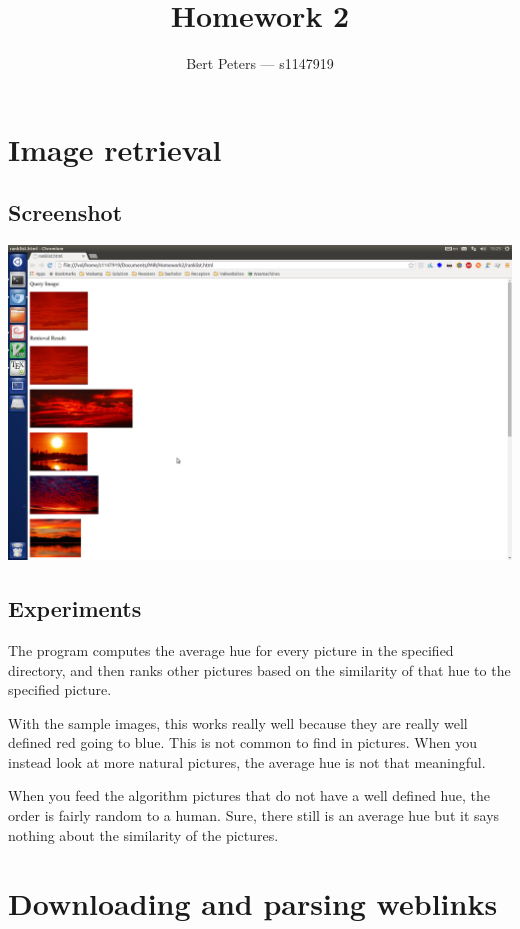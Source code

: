 \documentclass[12pt,a4paper]{article}
\title{Homework 2}
\author{Bert Peters --- s1147919}
\begin{document}
\maketitle

\section{Image retrieval}
\subsection{Screenshot}
\includegraphics[scale=0.25]{screenshot}

\subsection{Experiments}

The program computes the average hue for every picture in the specified directory, and then ranks other pictures based on the similarity of that hue to the specified picture.

With the sample images, this works really well because they are really well defined red going to blue. This is not common to find in pictures. When you instead look at more natural pictures, the average hue is not that meaningful.

When you feed the algorithm pictures that do not have a well defined hue, the order is fairly random to a human. Sure, there still is an average hue but it says nothing about the similarity of the pictures.

\section{Downloading and parsing weblinks}
\end{document}
